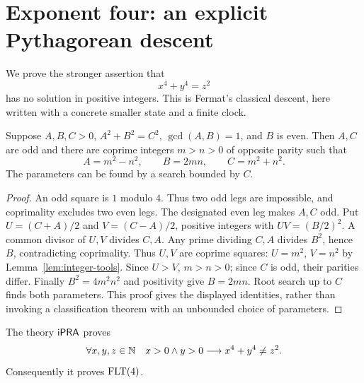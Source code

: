 \section{Exponent four: an explicit Pythagorean descent}
\label{sec:four}

We prove the stronger assertion that
\begin{equation}\label{eq:fermat42}
 x^4+y^4=z^2
\end{equation}
has no solution in positive integers. This is Fermat's classical descent,
here written with a concrete smaller state and a finite clock.

\begin{lemma}\label{lem:pythagoras}
Suppose $A,B,C>0$, $A^2+B^2=C^2$, $\gcd(A,B)=1$, and $B$ is even.
Then $A,C$ are odd and there are coprime integers $m>n>0$ of opposite
parity such that
\[
 A=m^2-n^2,\qquad B=2mn,\qquad C=m^2+n^2.
\]
The parameters can be found by a search bounded by $C$.
\end{lemma}

\begin{proof}
An odd square is $1$ modulo $4$. Thus two odd legs are impossible, and
coprimality excludes two even legs. The designated even leg makes $A,C$
odd. Put $U=(C+A)/2$ and $V=(C-A)/2$, positive integers with
$UV=(B/2)^2$. A common divisor of $U,V$ divides $C,A$. Any prime
dividing $C,A$ divides $B^2$, hence $B$, contradicting coprimality. Thus
$U,V$ are coprime squares: $U=m^2$, $V=n^2$ by
Lemma~\ref{lem:integer-tools}. Since $U>V$, $m>n>0$; since $C$ is odd,
their parities differ. Finally $B^2=4m^2n^2$ and positivity give
$B=2mn$. Root search up to $C$ finds both parameters. This proof gives
the displayed identities, rather than invoking a classification theorem
with an unbounded choice of parameters.
\end{proof}

\begin{theorem}\label{thm:four}
The theory $\mathsf{iPRA}$ proves
\[
 \forall x,y,z\in\mathbb N\quad x>0\wedge y>0
          \longrightarrow x^4+y^4\ne z^2.
\]
Consequently it proves $\operatorname{FLT}(4)$.
\end{theorem}

